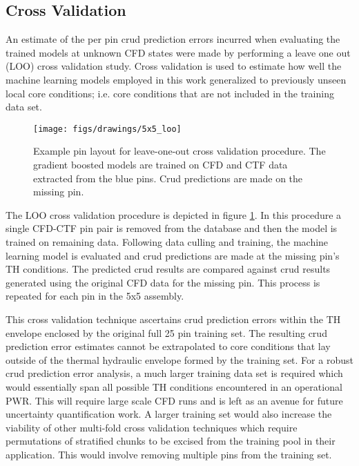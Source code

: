 \subsection{Cross Validation}

An estimate of the per pin crud prediction errors incurred when evaluating the trained models at unknown CFD states were made by performing a leave one out (LOO) cross validation study.  Cross validation is used to estimate how well the machine learning models employed in this work generalized to previously unseen local core conditions; i.e. core conditions that are not included in the training data set.

\begin{figure}[h]
    \centering
    \texttt{[image: figs/drawings/5x5\_loo]}
    \caption[Example pin layout for leave-one-out cross validation procedure.]{Example pin layout for leave-one-out cross validation procedure.  The gradient boosted models are trained on CFD and CTF data extracted from the blue pins.  Crud predictions are made on the missing pin.}
    \label{fig:5x5loo}
\end{figure}

The LOO cross validation procedure is depicted in figure \ref{fig:5x5loo}.  In this procedure a single CFD-CTF pin pair is removed from the database and then the model is trained on remaining data.  Following data culling and training, the machine learning model is evaluated and crud predictions are made at the missing pin's TH conditions.
The predicted crud results are compared against crud results generated using the original CFD data for the missing pin.  This process is repeated for each pin in the 5x5 assembly.

This cross validation technique ascertains crud prediction errors within the TH envelope enclosed by the original full 25 pin training set.  The resulting crud prediction error estimates cannot be extrapolated to core conditions that lay outside of the thermal hydraulic envelope formed by the training set.  For a robust crud prediction error analysis, a much larger training data set is required which would essentially span all possible TH conditions encountered in an operational PWR.  This will require large scale CFD runs and is left as an avenue for future uncertainty quantification work.  A larger training set would also increase the viability of other multi-fold cross validation techniques which require permutations of stratified chunks to be excised from the training pool in their application.  This would involve removing multiple pins from the training set.

